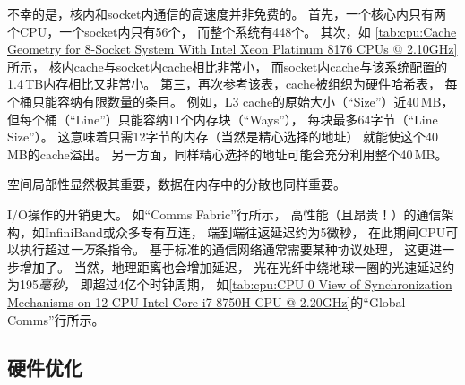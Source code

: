 不幸的是，核内和socket内通信的高速度并非免费的。
首先，一个核心内只有两个CPU，一个socket内只有56个，
而整个系统有448个。
其次，如
\cref{tab:cpu:Cache Geometry for 8-Socket System With Intel Xeon Platinum 8176 CPUs @ 2.10GHz}所示，
核内cache与socket内cache相比非常小，
而socket内cache与该系统配置的1.4\,TB内存相比又非常小。
第三，再次参考该表，cache被组织为硬件哈希表，
每个桶只能容纳有限数量的条目。
例如，L3 cache的原始大小（``Size''）近40\,MB，
但每个桶（``Line''）只能容纳11个内存块（``Ways''），
每块最多64字节（``Line Size''）。
这意味着只需12字节的内存（当然是精心选择的地址）
就能使这个40\,MB的cache溢出。
另一方面，同样精心选择的地址可能会充分利用整个40\,MB。

空间局部性显然极其重要，数据在内存中的分散也同样重要。

I/O操作的开销更大。
如``Comms Fabric''行所示，
高性能（且昂贵！）的通信架构，如InfiniBand或众多专有互连，
端到端往返延迟约为5微秒，
在此期间CPU可以执行超过\emph{一万}条指令。
基于标准的通信网络通常需要某种协议处理，
这更进一步增加了。
当然，地理距离也会增加延迟，
光在光纤中绕地球一圈的光速延迟约为195\emph{毫秒}，
即超过4亿个时钟周期，
如\cref{tab:cpu:CPU 0 View of Synchronization Mechanisms on 12-CPU Intel Core i7-8750H CPU @ 2.20GHz}的``Global Comms''行所示。


\QuickQuizEnd

\subsection{硬件优化}
\label{sec:cpu:Hardware Optimizations}

